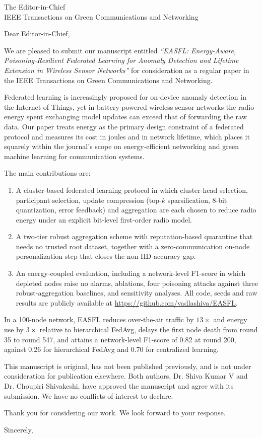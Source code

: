 \documentclass[11pt]{letter}
\date{\today}
\begin{document}
\begin{letter}{The Editor-in-Chief\\IEEE Transactions on Green Communications and Networking}
\opening{Dear Editor-in-Chief,}

We are pleased to submit our manuscript entitled \emph{``EASFL: Energy-Aware, Poisoning-Resilient Federated Learning for Anomaly Detection and Lifetime Extension in Wireless Sensor Networks''} for consideration as a regular paper in the IEEE Transactions on Green Communications and Networking.

Federated learning is increasingly proposed for on-device anomaly detection in the Internet of Things, yet in battery-powered wireless sensor networks the radio energy spent exchanging model updates can exceed that of forwarding the raw data. Our paper treats energy as the primary design constraint of a federated protocol and measures its cost in joules and in network lifetime, which places it squarely within the journal's scope on energy-efficient networking and green machine learning for communication systems.

The main contributions are:
\begin{enumerate}
\item A cluster-based federated learning protocol in which cluster-head selection, participant selection, update compression (top-$k$ sparsification, 8-bit quantization, error feedback) and aggregation are each chosen to reduce radio energy under an explicit bit-level first-order radio model.
\item A two-tier robust aggregation scheme with reputation-based quarantine that needs no trusted root dataset, together with a zero-communication on-node personalization step that closes the non-IID accuracy gap.
\item An energy-coupled evaluation, including a network-level F1-score in which depleted nodes raise no alarms, ablations, four poisoning attacks against three robust-aggregation baselines, and sensitivity analyses. All code, seeds and raw results are publicly available at \url{https://github.com/vadlashiva/EASFL}.
\end{enumerate}

In a 100-node network, EASFL reduces over-the-air traffic by $13\times$ and energy use by $3\times$ relative to hierarchical FedAvg, delays the first node death from round 35 to round 547, and attains a network-level F1-score of 0.82 at round 200, against 0.26 for hierarchical FedAvg and 0.70 for centralized learning.

This manuscript is original, has not been published previously, and is not under consideration for publication elsewhere. Both authors, Dr. Shiva Kumar V and Dr. Choupiri Shivakeshi, have approved the manuscript and agree with its submission. We have no conflicts of interest to declare.

Thank you for considering our work. We look forward to your response.

\closing{Sincerely,}
\end{letter}
\end{document}
